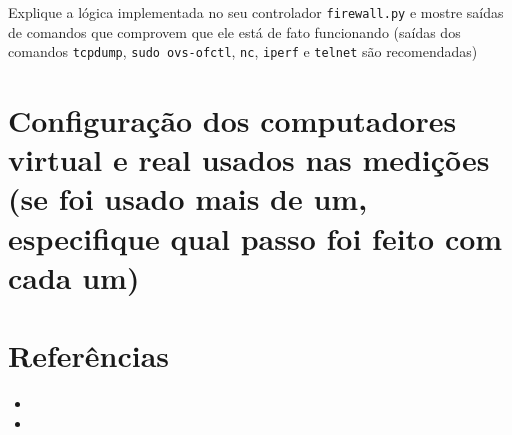 \documentclass[12pt,letterpaper]{article}
\begin{document}
Explique a lógica implementada no seu controlador
\texttt{firewall.py} e mostre saídas de comandos que comprovem que ele
está de fato funcionando (saídas dos comandos \texttt{tcpdump},
\texttt{sudo ovs-ofctl}, \texttt{nc}, \texttt{iperf} e \texttt{telnet}
são recomendadas)


\section{Configuração dos computadores virtual e real usados nas
medições (se foi usado mais de um, especifique qual passo foi feito
com cada um)}

\section{Referências}

\begin{itemize}
   \item
   \item
\end{itemize}
\end{document}
